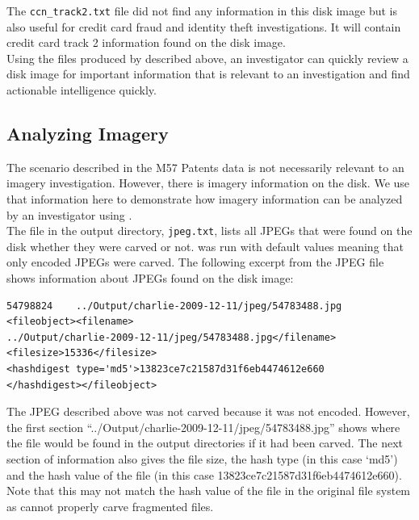 The \texttt{ccn\_track2.txt} file did not find any information in this disk image but is also useful for credit card fraud and identity theft investigations. It will contain credit card track 2 information found on the disk image.\\

Using the files produced by \bulk described above, an investigator can quickly review a disk image for important information that is relevant to an investigation and find actionable intelligence quickly. 

\subsection{Analyzing Imagery} 
The scenario described in the M57 Patents data is not necessarily relevant to an imagery investigation. However, there is imagery information on the disk. We use that information here to demonstrate how imagery information can be analyzed by an investigator using \bulk.\\

The file in the output directory, \texttt{jpeg.txt}, lists all JPEGs that were found on the disk whether they were carved or not. \bulk was run with default values meaning that only encoded JPEGs were carved. The following excerpt from the JPEG file shows information about JPEGs found on the disk image:
\lstset{style=customfile}
\begin{lstlisting}
54798824	../Output/charlie-2009-12-11/jpeg/54783488.jpg	<fileobject><filename>
../Output/charlie-2009-12-11/jpeg/54783488.jpg</filename><filesize>15336</filesize>
<hashdigest type='md5'>13823ce7c21587d31f6eb4474612e660
</hashdigest></fileobject>
\end{lstlisting}
The JPEG described above was not carved because it was not encoded. However, the first section ``../Output/charlie-2009-12-11/jpeg/54783488.jpg'' shows where the file would be found in the output directories if it had been carved. The next section of information also gives the file size, the hash type (in this case `md5') and the hash value of the file (in this case 13823ce7c21587d31f6eb4474612e660). Note that this may not match the hash value of the file in the original file system as \bulk cannot properly carve fragmented files.\\

